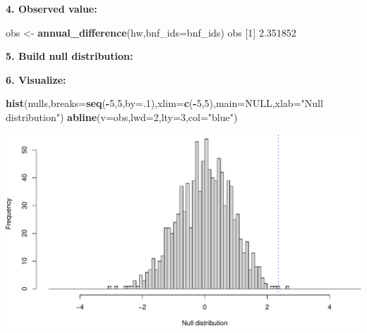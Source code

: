 \documentclass[
]{book}
\newenvironment{Shaded}{\begin{snugshade}}{\end{snugshade}}
\newcommand{\ControlFlowTok}[1]{\textcolor[rgb]{0.13,0.29,0.53}{\textbf{#1}}}
\newcommand{\DataTypeTok}[1]{\textcolor[rgb]{0.13,0.29,0.53}{#1}}
\newcommand{\DecValTok}[1]{\textcolor[rgb]{0.00,0.00,0.81}{#1}}
\newcommand{\FloatTok}[1]{\textcolor[rgb]{0.00,0.00,0.81}{#1}}
\newcommand{\KeywordTok}[1]{\textcolor[rgb]{0.13,0.29,0.53}{\textbf{#1}}}
\newcommand{\NormalTok}[1]{#1}
\newcommand{\OperatorTok}[1]{\textcolor[rgb]{0.81,0.36,0.00}{\textbf{#1}}}
\newcommand{\OtherTok}[1]{\textcolor[rgb]{0.56,0.35,0.01}{#1}}
\newcommand{\StringTok}[1]{\textcolor[rgb]{0.31,0.60,0.02}{#1}}
\begin{document}
\textbf{4. Observed value:}

\begin{Shaded}
\begin{Highlighting}[]
\NormalTok{obs <-}\StringTok{ }\KeywordTok{annual_difference}\NormalTok{(hw,}\DataTypeTok{bnf_ids=}\NormalTok{bnf_ids)}
\NormalTok{obs }
\NormalTok{[}\DecValTok{1}\NormalTok{] }\FloatTok{2.351852}
\end{Highlighting}
\end{Shaded}

\textbf{5. Build null distribution:}

\begin{Shaded}
\end{Shaded}

\textbf{6. Visualize:}

\begin{Shaded}
\begin{Highlighting}[]
\KeywordTok{hist}\NormalTok{(nulls,}\DataTypeTok{breaks=}\KeywordTok{seq}\NormalTok{(}\OperatorTok{-}\DecValTok{5}\NormalTok{,}\DecValTok{5}\NormalTok{,}\DataTypeTok{by=}\NormalTok{.}\DecValTok{1}\NormalTok{),}\DataTypeTok{xlim=}\KeywordTok{c}\NormalTok{(}\OperatorTok{-}\DecValTok{5}\NormalTok{,}\DecValTok{5}\NormalTok{),}\DataTypeTok{main=}\OtherTok{NULL}\NormalTok{,}\DataTypeTok{xlab=}\StringTok{"Null distribution"}\NormalTok{)}
\KeywordTok{abline}\NormalTok{(}\DataTypeTok{v=}\NormalTok{obs,}\DataTypeTok{lwd=}\DecValTok{2}\NormalTok{,}\DataTypeTok{lty=}\DecValTok{3}\NormalTok{,}\DataTypeTok{col=}\StringTok{"blue"}\NormalTok{)}
\end{Highlighting}
\end{Shaded}

\includegraphics{figures/unnamed-chunk-463-1.pdf}
\end{document}
